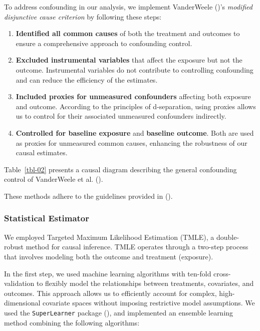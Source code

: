 \documentclass[
  single column]{article}
\providecommand{\tightlist}{%
  \setlength{\itemsep}{0pt}\setlength{\parskip}{0pt}}\usepackage{longtable,booktabs,array}
\begin{document}
To address confounding in our analysis, we implement VanderWeele
()'s \emph{modified disjunctive
cause criterion} by following these steps:

\begin{enumerate}
\def\labelenumi{\arabic{enumi}.}
\tightlist
\item
  \textbf{Identified all common causes} of both the treatment and
  outcomes to ensure a comprehensive approach to confounding control.
\item
  \textbf{Excluded instrumental variables} that affect the exposure but
  not the outcome. Instrumental variables do not contribute to
  controlling confounding and can reduce the efficiency of the
  estimates.
\item
  \textbf{Included proxies for unmeasured confounders} affecting both
  exposure and outcome. According to the principles of d-separation,
  using proxies allows us to control for their associated unmeasured
  confounders indirectly.
\item
  \textbf{Controlled for baseline exposure} and \textbf{baseline
  outcome}. Both are used as proxies for unmeasured common causes,
  enhancing the robustness of our causal estimates.
\end{enumerate}

Table~\ref{tbl-02} presents a causal diagram describing the general
confounding control of VanderWeele et al.
().

These methods adhere to the guidelines provided in
().

\subsubsection{Statistical Estimator}\label{statistical-estimator}

We employed Targeted Maximum Likelihood Estimation (TMLE), a
double-robust method for causal inference. TMLE operates through a
two-step process that involves modeling both the outcome and treatment
(exposure).

In the first step, we used machine learning algorithms with ten-fold
cross-validation to flexibly model the relationships between treatments,
covariates, and outcomes. This approach allows us to efficiently account
for complex, high-dimensional covariate spaces without imposing
restrictive model assumptions. We used the \texttt{SuperLearner} package
(), and implemented an
ensemble learning method combining the following algorithms:
\end{document}
